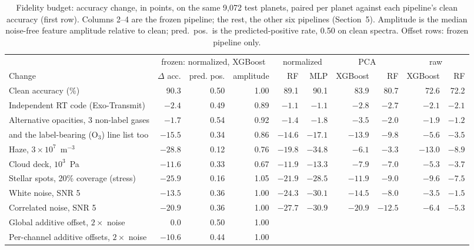 \documentclass{article}
\begin{document}
\begin{table}[t]
  \caption{Fidelity budget: accuracy change, in points, on the same 9,072 test planets, paired per planet against each pipeline's clean accuracy (first row). Columns 2--4 are the frozen pipeline; the rest, the other six pipelines (Section~5). Amplitude is the median noise-free feature amplitude relative to clean; pred.\ pos.\ is the predicted-positive rate, 0.50 on clean spectra. Offset rows: frozen pipeline only.}
  \label{tab:budget}
  \centering
  \scriptsize
  \setlength{\tabcolsep}{3.5pt}
  \begin{tabular}{lrrrrrrrrr}
    \toprule
    & \multicolumn{3}{c}{frozen: normalized, XGBoost} & \multicolumn{2}{c}{normalized} & \multicolumn{2}{c}{PCA} & \multicolumn{2}{c}{raw} \\
    \cmidrule(lr){2-4}\cmidrule(lr){5-6}\cmidrule(lr){7-8}\cmidrule(lr){9-10}
    Change & $\Delta$ acc. & pred. pos. & amplitude & RF & MLP & XGBoost & RF & XGBoost & RF \\
    \midrule
    Clean accuracy (\%) & 90.3 & 0.50 & 1.00 & 89.1 & 90.1 & 83.9 & 80.7 & 72.6 & 72.2 \\
    Independent RT code (Exo-Transmit) & $-2.4$ & 0.49 & 0.89 & $-1.1$ & $-1.1$ & $-2.8$ & $-2.7$ & $-2.1$ & $-2.1$ \\
    Alternative opacities, 3 non-label gases & $-1.7$ & 0.54 & 0.92 & $-1.4$ & $-1.8$ & $-3.5$ & $-2.0$ & $-1.9$ & $-1.2$ \\
    \quad and the label-bearing (O$_3$) line list too & $-15.5$ & 0.34 & 0.86 & $-14.6$ & $-17.1$ & $-13.9$ & $-9.8$ & $-5.6$ & $-3.5$ \\
    Haze, $3 \times 10^{7}$~m$^{-3}$ & $-28.8$ & 0.12 & 0.76 & $-19.8$ & $-34.8$ & $-6.1$ & $-3.3$ & $-13.0$ & $-8.9$ \\
    Cloud deck, $10^{3}$~Pa & $-11.6$ & 0.33 & 0.67 & $-11.9$ & $-13.3$ & $-7.9$ & $-7.0$ & $-5.3$ & $-3.7$ \\
    Stellar spots, 20\% coverage (stress) & $-25.9$ & 0.16 & 1.05 & $-21.9$ & $-28.5$ & $-11.9$ & $-9.0$ & $-9.6$ & $-7.5$ \\
    White noise, SNR 5 & $-13.5$ & 0.36 & 1.00 & $-24.3$ & $-30.1$ & $-14.5$ & $-8.0$ & $-3.5$ & $-1.5$ \\
    Correlated noise, SNR 5 & $-20.9$ & 0.36 & 1.00 & $-27.7$ & $-30.9$ & $-20.9$ & $-12.5$ & $-6.4$ & $-5.3$ \\
    Global additive offset, $2\times$ noise & $0.0$ & 0.50 & 1.00 & & & & & & \\
    Per-channel additive offsets, $2\times$ noise & $-10.6$ & 0.44 & 1.00 & & & & & & \\
    \bottomrule
  \end{tabular}
\end{table}
\end{document}
